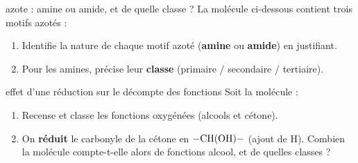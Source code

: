 \documentclass[11pt,a4paper]{article}
\begin{document}
\begin{exo}{azote : amine ou amide, et de quelle classe ?}
La molécule ci-dessous contient trois motifs azotés :
\begin{center}\end{center}
\begin{enumerate}[label=\textbf{\alph*)},leftmargin=2em,itemsep=1pt]
  \item Identifie la nature de chaque motif azoté (\textbf{amine} ou \textbf{amide}) en justifiant.
  \item Pour les amines, précise leur \textbf{classe} (primaire / secondaire / tertiaire).
\end{enumerate}
\end{exo}

\begin{exo}{effet d'une réduction sur le décompte des fonctions}
Soit la molécule :
\begin{center}\end{center}
\begin{enumerate}[label=\textbf{\alph*)},leftmargin=2em,itemsep=1pt]
  \item Recense et classe les fonctions oxygénées (alcools et cétone).
  \item On \textbf{réduit} le carbonyle de la cétone en $\ce{-CH(OH)-}$ (ajout de H). Combien la molécule compte-t-elle alors de fonctions alcool, et de quelles classes ?
\end{enumerate}
\end{exo}
\end{document}

